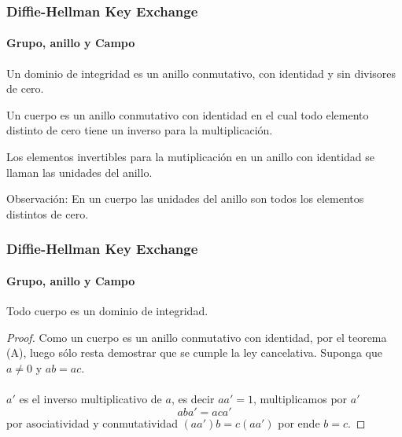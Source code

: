 \documentclass[spanish, mexico]{beamer}
\begin{document}
	\begin{frame}
	    \frametitle{Diffie-Hellman Key Exchange}
		\framesubtitle{Grupo, anillo y Campo}
	    \begin{definition}
	        Un dominio de integridad es un anillo conmutativo, con identidad y sin divisores de cero.
	    \end{definition}
	    \begin{definition}[Cuerpo]
	        Un cuerpo es un anillo conmutativo con identidad en el cual todo elemento distinto de cero tiene un inverso para la multiplicación.
	    \end{definition}
	    \begin{definition}
	        Los elementos invertibles para la mutiplicación en un anillo con identidad se llaman las unidades del anillo.
	    \end{definition}
	    Observación: En un cuerpo las unidades del anillo son todos los elementos distintos de cero.
	\end{frame}
	
	\begin{frame}
	    \frametitle{Diffie-Hellman Key Exchange}
		\framesubtitle{Grupo, anillo y Campo}
	    \begin{theorem}[D] Todo cuerpo es un dominio de integridad.
	    \end{theorem}
	    \begin{proof}
	        Como un cuerpo es un anillo conmutativo con identidad, por el teorema (A), luego sólo resta demostrar que se cumple la ley cancelativa. Suponga que $a\neq0$ y $ab = ac$.\\~\\
	        $a'$ es el inverso multiplicativo de $a$, es decir $aa' = 1$, multiplicamos por $a'$
	        $$aba' = aca'$$
	        por asociatividad y conmutatividad $(aa')b = c(aa')$ por ende $b = c$.
	    \end{proof}
	\end{frame}
	
\end{document}
